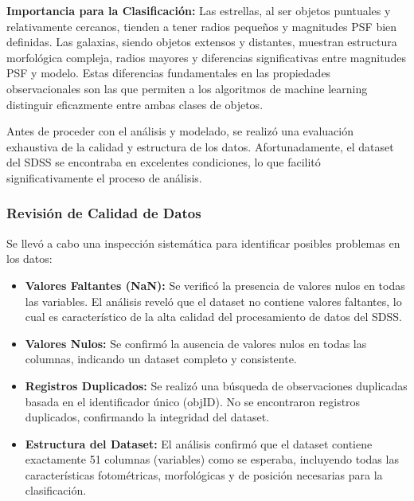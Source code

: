 \documentclass{article}
\begin{document}
\textbf{Importancia para la Clasificación:} Las estrellas, al ser objetos puntuales y relativamente cercanos, tienden a tener radios pequeños y magnitudes PSF bien definidas. Las galaxias, siendo objetos extensos y distantes, muestran estructura morfológica compleja, radios mayores y diferencias significativas entre magnitudes PSF y modelo. Estas diferencias fundamentales en las propiedades observacionales son las que permiten a los algoritmos de machine learning distinguir eficazmente entre ambas clases de objetos.



Antes de proceder con el análisis y modelado, se realizó una evaluación exhaustiva de la calidad y estructura de los datos. Afortunadamente, el dataset del SDSS se encontraba en excelentes condiciones, lo que facilitó significativamente el proceso de análisis.

\subsubsection{Revisión de Calidad de Datos}

Se llevó a cabo una inspección sistemática para identificar posibles problemas en los datos:

\begin{itemize}
    \item \textbf{Valores Faltantes (NaN):} Se verificó la presencia de valores nulos en todas las variables. El análisis reveló que el dataset no contiene valores faltantes, lo cual es característico de la alta calidad del procesamiento de datos del SDSS.
    
    \item \textbf{Valores Nulos:} Se confirmó la ausencia de valores nulos en todas las columnas, indicando un dataset completo y consistente.
    
    \item \textbf{Registros Duplicados:} Se realizó una búsqueda de observaciones duplicadas basada en el identificador único (objID). No se encontraron registros duplicados, confirmando la integridad del dataset.
    
    \item \textbf{Estructura del Dataset:} El análisis confirmó que el dataset contiene exactamente 51 columnas (variables) como se esperaba, incluyendo todas las características fotométricas, morfológicas y de posición necesarias para la clasificación.
\end{itemize}
\end{document}
